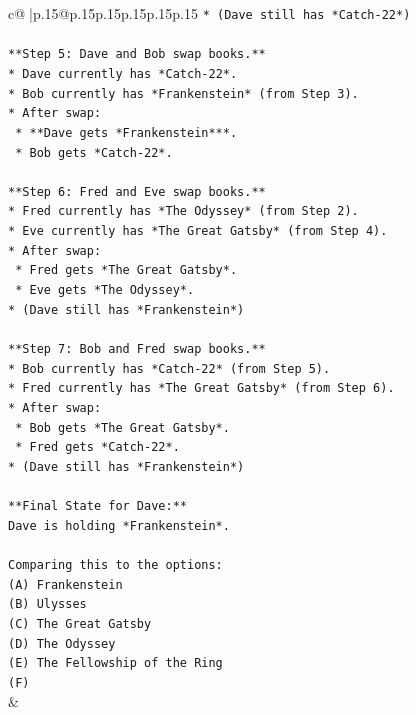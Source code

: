 \documentclass{article}
\begin{document}
{\begin{supertabular}{c@{$\;$}|p{.15\linewidth}@{}p{.15\linewidth}p{.15\linewidth}p{.15\linewidth}p{.15\linewidth}p{.15\linewidth}}
{{{\texttt{*   (Dave still has *Catch{-}22*)} \\
\\ 
\texttt{**Step 5: Dave and Bob swap books.**} \\
\texttt{*   Dave currently has *Catch{-}22*.} \\
\texttt{*   Bob currently has *Frankenstein* (from Step 3).} \\
\texttt{*   After swap:} \\
\texttt{    *   **Dave gets *Frankenstein***.} \\
\texttt{    *   Bob gets *Catch{-}22*.} \\
\\ 
\texttt{**Step 6: Fred and Eve swap books.**} \\
\texttt{*   Fred currently has *The Odyssey* (from Step 2).} \\
\texttt{*   Eve currently has *The Great Gatsby* (from Step 4).} \\
\texttt{*   After swap:} \\
\texttt{    *   Fred gets *The Great Gatsby*.} \\
\texttt{    *   Eve gets *The Odyssey*.} \\
\texttt{*   (Dave still has *Frankenstein*)} \\
\\ 
\texttt{**Step 7: Bob and Fred swap books.**} \\
\texttt{*   Bob currently has *Catch{-}22* (from Step 5).} \\
\texttt{*   Fred currently has *The Great Gatsby* (from Step 6).} \\
\texttt{*   After swap:} \\
\texttt{    *   Bob gets *The Great Gatsby*.} \\
\texttt{    *   Fred gets *Catch{-}22*.} \\
\texttt{*   (Dave still has *Frankenstein*)} \\
\\ 
\texttt{**Final State for Dave:**} \\
\texttt{Dave is holding *Frankenstein*.} \\
\\ 
\texttt{Comparing this to the options:} \\
\texttt{(A) Frankenstein} \\
\texttt{(B) Ulysses} \\
\texttt{(C) The Great Gatsby} \\
\texttt{(D) The Odyssey} \\
\texttt{(E) The Fellowship of the Ring} \\
\texttt{(F)} \\
            }
        }
    }
    & \\ \\


\end{supertabular}}
\end{document}
